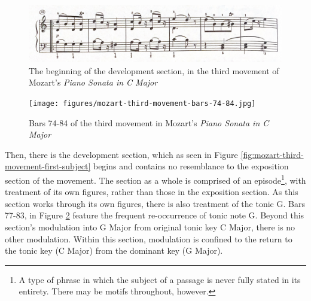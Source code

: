 \begin{figure}
	\centering
	\includegraphics[width=\textwidth]{figures/mozart-third-movement-development-section-first-six-bars.jpg}
	\caption[The development section of Movement III, in Mozart's \textit{Piano Sonata in C Major}]{The beginning of the development section, in the third movement of Mozart's \textit{Piano Sonata in C Major}}
	\label{fig:mozart-third-movement-development-section-first-six-bars}
\end{figure}

\begin{figure}
	\centering
	\texttt{[image: figures/mozart-third-movement-bars-74-84.jpg]}
	\caption{Bars 74-84 of the third movement in Mozart's \textit{Piano Sonata in C Major}}
	\label{fig:mozart-third-movement-bars-74-84}
\end{figure}

Then, there is the development section, which as seen in Figure \ref{fig:mozart-third-movement-first-subject}\autocite{Henle_1977} begins and contains no resemblance to the exposition section of the movement. The section as a whole is comprised of an episode\footnote{A type of phrase in which the subject of a passage is never fully stated in its entirety. There may be motifs throughout, however.}, with treatment of its own figures, rather than those in the exposition section. As this section works through its own figures, there is also treatment of the tonic G. Bars 77-83, in Figure \ref{fig:mozart-third-movement-bars-74-84}\autocite{Henle_1977} feature the frequent re-occurrence of tonic note G. Beyond this section's modulation into G Major from original tonic key C Major, there is no other modulation. Within this section, modulation is confined to the return to the tonic key (C Major) from the dominant key (G Major).

